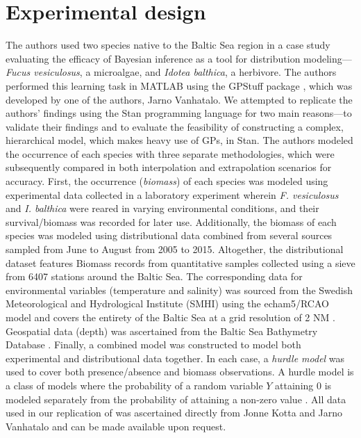 \documentclass[
  12pt,
  oneside]{book}
\theoremstyle{definition}
\theoremstyle{definition}
\theoremstyle{definition}
\theoremstyle{remark}
\begin{document}
\hypertarget{experimental-design}{%
\section{Experimental design}\label{experimental-design}}

The authors used two species native to the Baltic Sea region in a case study evaluating the efficacy of Bayesian inference as a tool for distribution modeling---\emph{Fucus vesiculosus}, a microalgae, and \emph{Idotea balthica}, a herbivore.
The authors performed this learning task in MATLAB using the GPStuff package \citep{Vanhatalo2015}, which was developed by one of the authors, Jarno Vanhatalo.
We attempted to replicate the authors' findings using the Stan programming language for two main reasons---to validate their findings and to evaluate the feasibility of constructing a complex, hierarchical model, which makes heavy use of GPs, in Stan.
The authors modeled the occurrence of each species with three separate methodologies, which were subsequently compared in both interpolation and extrapolation scenarios for accuracy.
First, the occurrence (\emph{biomass}) of each species was modeled using experimental data collected in a laboratory experiment wherein \emph{F. vesiculosus} and \emph{I. balthica} were reared in varying environmental conditions, and their survival/biomass was recorded for later use.
Additionally, the biomass of each species was modeled using distributional data combined from several sources sampled from June to August from 2005 to 2015.
Altogether, the distributional dataset features Biomass records from quantitative samples collected using a sieve from 6407 stations around the Baltic Sea.
The corresponding data for environmental variables (temperature and salinity) was sourced from the Swedish Meteorological and Hydrological Institute (SMHI) using the echam5/RCAO model and covers the entirety of the Baltic Sea at a grid resolution of 2 NM \citep{Meier2012}.
Geospatial data (depth) was ascertained from the Baltic Sea Bathymetry Database \citep{Bath2021}.
Finally, a combined model was constructed to model both experimental and distributional data together.
In each case, a \emph{hurdle model} was used to cover both presence/absence and biomass observations.
A hurdle model is a class of models where the probability of a random variable \(Y\) attaining 0 is modeled separately from the probability of attaining a non-zero value \citep[  5.6]{StanManual2016}.
All data used in our replication of \citet{Kotta2019} was ascertained directly from Jonne Kotta and Jarno Vanhatalo and can be made available upon request.
\end{document}
